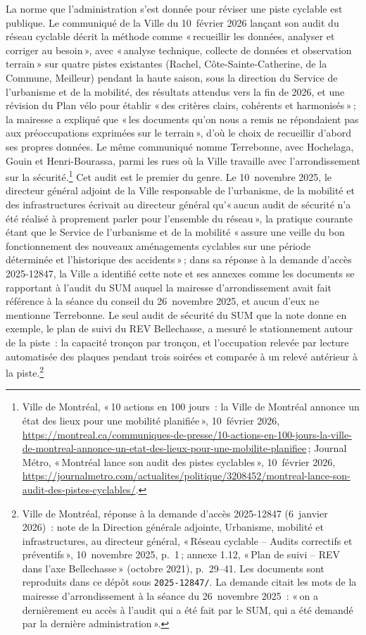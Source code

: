 \documentclass[11pt,letterpaper]{article}
\begin{document}
La norme que l'administration s'est donnée pour réviser une piste cyclable
est publique. Le communiqué de la Ville du 10~février 2026 lançant son audit
du réseau cyclable décrit la méthode comme «\,recueillir les données,
analyser et corriger au besoin\,», avec «\,analyse technique, collecte de
données et observation terrain\,» sur quatre pistes existantes (Rachel,
Côte-Sainte-Catherine, de la Commune, Meilleur) pendant la haute saison,
sous la direction du Service de l'urbanisme et de la mobilité, des résultats
attendus vers la fin de 2026, et une révision du Plan vélo pour établir
«\,des critères clairs, cohérents et harmonisés\,»\,; la mairesse a expliqué
que «\,les documents qu'on nous a remis ne répondaient pas aux préoccupations
exprimées sur le terrain\,», d'où le choix de recueillir d'abord ses propres
données. Le même communiqué nomme Terrebonne, avec Hochelaga, Gouin et
Henri-Bourassa, parmi les rues où la Ville travaille avec l'arrondissement
sur la sécurité.\footnote{Ville de Montréal, «\,10 actions en 100 jours~: la
Ville de Montréal annonce un état des lieux pour une mobilité
planifiée\,», 10~février 2026,
\url{https://montreal.ca/communiques-de-presse/10-actions-en-100-jours-la-ville-de-montreal-annonce-un-etat-des-lieux-pour-une-mobilite-planifiee}\,;
Journal Métro, «\,Montréal lance son audit des pistes cyclables\,»,
10~février 2026,
\url{https://journalmetro.com/actualites/politique/3208452/montreal-lance-son-audit-des-pistes-cyclables/}.}
Cet audit est le premier du genre. Le 10~novembre 2025, le directeur
général adjoint de la Ville responsable de l'urbanisme, de la mobilité et
des infrastructures écrivait au directeur général qu'«\,aucun audit de
sécurité n'a été réalisé à proprement parler pour l'ensemble du
réseau\,», la pratique courante étant que le Service de l'urbanisme et de
la mobilité «\,assure une veille du bon fonctionnement des nouveaux
aménagements cyclables sur une période déterminée et l'historique des
accidents\,»\,; dans sa réponse à la demande d'accès 2025-12847, la Ville
a identifié cette note et ses annexes comme les documents se rapportant à
l'audit du SUM auquel la mairesse d'arrondissement avait fait référence à
la séance du conseil du 26~novembre 2025, et aucun d'eux ne mentionne
Terrebonne. Le seul audit de sécurité du SUM que la note donne en exemple,
le plan de suivi du REV Bellechasse, a mesuré le stationnement autour de
la piste~: la capacité tronçon par tronçon, et l'occupation relevée par
lecture automatisée des plaques pendant trois soirées et comparée à un
relevé antérieur à la piste.\footnote{Ville de Montréal, réponse à la
demande d'accès 2025-12847 (6~janvier 2026)~: note de la Direction
générale adjointe, Urbanisme, mobilité et infrastructures, au directeur
général, «\,Réseau cyclable -- Audits correctifs et préventifs\,»,
10~novembre 2025, p.~1\,; annexe 1.12, «\,Plan de suivi -- REV dans l'axe
Bellechasse\,» (octobre 2021), p.~29--41. Les documents sont reproduits
dans ce dépôt sous \texttt{2025-12847/}. La demande citait les mots de la
mairesse d'arrondissement à la séance du 26~novembre 2025~: «\,on a
dernièrement eu accès à l'audit qui a été fait par le SUM, qui a été
demandé par la dernière administration\,».}
\end{document}
